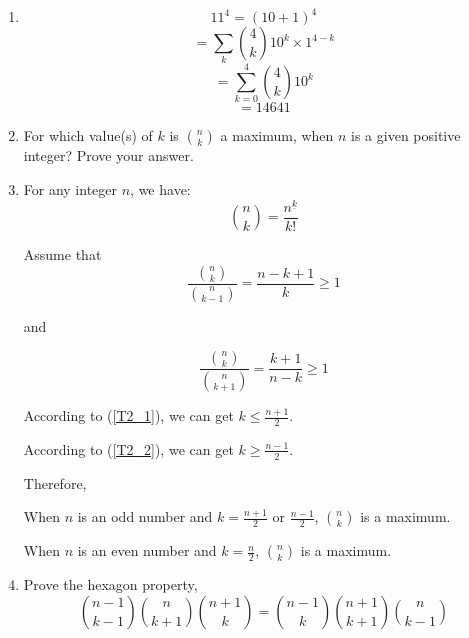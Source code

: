 \documentclass[12pt,a4paper]{article}
\makeatletter
\newtheorem*{solution}{Solution}
\theoremstyle{definition}
\renewenvironment{solution}[1][Solution] {\par\pushQED{\qed}\normalfont\topsep6\p@\@plus6\p@\relax\trivlist\item[\hskip\labelsep\bfseries#1\@addpunct{.}]\ignorespaces}{\popQED\endtrivlist\@endpefalse} \makeatother
\makeatother
\begin{document}
\begin{enumerate}
\begin{solution}
        	\begin{equation*}
        	    11^4=(10+1)^4
        	\end{equation*}
            \begin{equation*}    
        	    =\sum_{k} \binom{4}{k} 10^k\times 1^{4-k}
        	\end{equation*}  
            \begin{equation*} 
        	    =\sum_{k=0}^{4} \binom{4}{k} 10^k
        	\end{equation*}
            \begin{equation*}   
        	    =14641
        	\end{equation*}
        \end{solution}
    \item 
        For which value(s) of $k$ is $\binom{n}{k}$ a maximum, when $n$ is a given positive integer? Prove your answer.
        \begin{solution}
        	For any integer $n$, we have:
        	\begin{equation*}
        	    \binom{n}{k}=\frac{n^{\underline{k}}}{k!}
        	\end{equation*}
        	
        	Assume that 
        	\begin{equation}\label{T2_1}
        	   \frac {\binom{n}{k}}{\binom{n}{k-1}}=\frac{n-k+1}{k}\ge 1
        	\end{equation}
        	
        	and
        	
        	\begin{equation}\label{T2_2}
        	   \frac{\binom{n}{k}}{\binom{n}{k+1}}=\frac{k+1}{n-k}\ge 1
        	\end{equation}
        	
        	According to (\ref{T2_1}), we can get $k\le \frac{n+1}{2}$.
        	
        	According to (\ref{T2_2}), we can get $k \ge \frac{n-1}{2}$.
        	
        	Therefore,
        	
        	When $n$ is an odd number and $k=\frac{n+1}{2}$ or $\frac{n-1}{2}$, $\binom{n}{k}$ is a maximum.
        	
        	When $n$ is an even number and $k=\frac{n}{2}$, $\binom{n}{k}$ is a maximum.
        	
        \end{solution}
    \item 
        Prove the hexagon property,
        \begin{equation*}
            \binom{n-1}{k-1}\binom{n}{k+1}\binom{n+1}{k}=\binom{n-1}{k}\binom{n+1}{k+1}\binom{n}{k-1}
        \end{equation*}
        

\end{enumerate}
\end{document}
